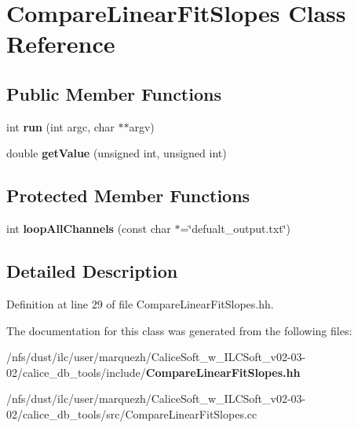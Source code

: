 \section{Compare\-Linear\-Fit\-Slopes Class Reference}
\label{classCompareLinearFitSlopes}
\subsection*{Public Member Functions}
\begin{DoxyCompactItemize}
\item 
int {\bfseries run} (int argc, char $\ast$$\ast$argv)\label{classCompareLinearFitSlopes_aaa29dbc205e98ad53aab318ee5f9f9f1}

\item 
double {\bfseries get\-Value} (unsigned int, unsigned int)\label{classCompareLinearFitSlopes_ab48cfd854b642a7d2f092fc56b43735e}

\end{DoxyCompactItemize}
\subsection*{Protected Member Functions}
\begin{DoxyCompactItemize}
\item 
int {\bfseries loop\-All\-Channels} (const char $\ast$=\char`\"{}defualt\-\_\-output.\-txt\char`\"{})\label{classCompareLinearFitSlopes_a76c57ba10ce263ca06e226835ae5f492}

\end{DoxyCompactItemize}


\subsection{Detailed Description}


Definition at line 29 of file Compare\-Linear\-Fit\-Slopes.\-hh.



The documentation for this class was generated from the following files\-:\begin{DoxyCompactItemize}
\item 
/nfs/dust/ilc/user/marquezh/\-Calice\-Soft\-\_\-w\-\_\-\-I\-L\-C\-Soft\-\_\-v02-\/03-\/02/calice\-\_\-db\-\_\-tools/include/{\bf Compare\-Linear\-Fit\-Slopes.\-hh}\item 
/nfs/dust/ilc/user/marquezh/\-Calice\-Soft\-\_\-w\-\_\-\-I\-L\-C\-Soft\-\_\-v02-\/03-\/02/calice\-\_\-db\-\_\-tools/src/Compare\-Linear\-Fit\-Slopes.\-cc\end{DoxyCompactItemize}
